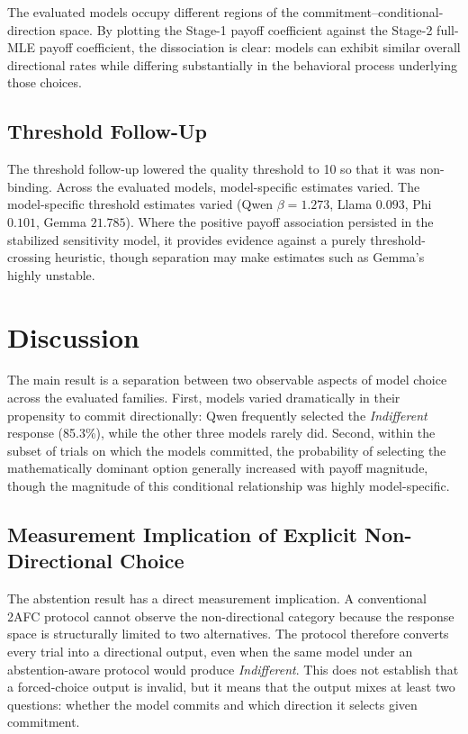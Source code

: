 \documentclass[10pt,journal,compsoc]{IEEEtran}
\begin{document}
The evaluated models occupy different regions of the commitment–conditional-direction space. By plotting the Stage-1 payoff coefficient against the Stage-2 full-MLE payoff coefficient, the dissociation is clear: models can exhibit similar overall directional rates while differing substantially in the behavioral process underlying those choices. 

\subsection{Threshold Follow-Up}
The threshold follow-up lowered the quality threshold to 10 so that it was non-binding. Across the evaluated models, model-specific estimates varied. The model-specific threshold estimates varied (Qwen $\beta=1.273$, Llama $0.093$, Phi $0.101$, Gemma $21.785$). Where the positive payoff association persisted in the stabilized sensitivity model, it provides evidence against a purely threshold-crossing heuristic, though separation may make estimates such as Gemma's highly unstable.

\section{Discussion}

\label{sec:discussion}

The main result is a separation between two observable aspects of model choice across the evaluated families. First, models varied dramatically in their propensity to commit directionally: Qwen frequently selected the \textit{Indifferent} response (85.3\%), while the other three models rarely did. Second, within the subset of trials on which the models committed, the probability of selecting the mathematically dominant option generally increased with payoff magnitude, though the magnitude of this conditional relationship was highly model-specific.

\subsection{Measurement Implication of Explicit Non-Directional Choice}
The abstention result has a direct measurement implication. A conventional 2AFC protocol cannot observe the non-directional category because the response space is structurally limited to two alternatives. The protocol therefore converts every trial into a directional output, even when the same model under an abstention-aware protocol would produce \textit{Indifferent}. This does not establish that a forced-choice output is invalid, but it means that the output mixes at least two questions: whether the model commits and which direction it selects given commitment.
\end{document}
